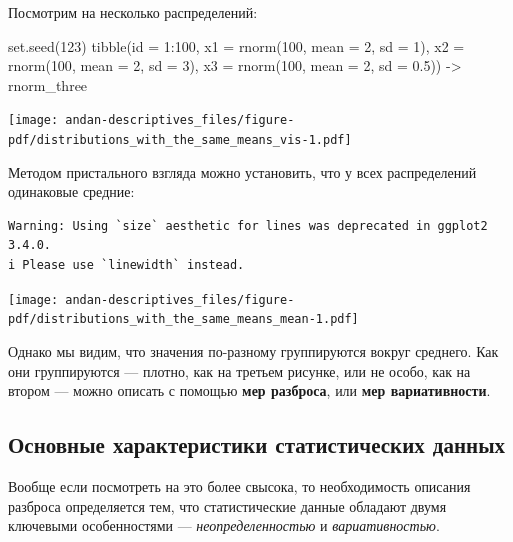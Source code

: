 \documentclass[
  letterpaper,
]{scrbook}
\newenvironment{Shaded}{}{}
\newcommand{\AttributeTok}[1]{\textcolor[rgb]{0.84,0.23,0.29}{#1}}
\newcommand{\DecValTok}[1]{\textcolor[rgb]{0.00,0.36,0.77}{#1}}
\newcommand{\FloatTok}[1]{\textcolor[rgb]{0.00,0.36,0.77}{#1}}
\newcommand{\FunctionTok}[1]{\textcolor[rgb]{0.44,0.26,0.76}{#1}}
\newcommand{\NormalTok}[1]{\textcolor[rgb]{0.14,0.16,0.18}{#1}}
\newcommand{\OtherTok}[1]{\textcolor[rgb]{0.44,0.26,0.76}{#1}}
\newcommand{\SpecialCharTok}[1]{\textcolor[rgb]{0.00,0.36,0.77}{#1}}
\theoremstyle{definition}
\theoremstyle{remark}
\begin{document}
Посмотрим на несколько распределений:

\begin{Shaded}
\begin{Highlighting}[]
\FunctionTok{set.seed}\NormalTok{(}\DecValTok{123}\NormalTok{)}
\FunctionTok{tibble}\NormalTok{(}\AttributeTok{id =} \DecValTok{1}\SpecialCharTok{:}\DecValTok{100}\NormalTok{,}
       \AttributeTok{x1 =} \FunctionTok{rnorm}\NormalTok{(}\DecValTok{100}\NormalTok{, }\AttributeTok{mean =} \DecValTok{2}\NormalTok{, }\AttributeTok{sd =} \DecValTok{1}\NormalTok{),}
       \AttributeTok{x2 =} \FunctionTok{rnorm}\NormalTok{(}\DecValTok{100}\NormalTok{, }\AttributeTok{mean =} \DecValTok{2}\NormalTok{, }\AttributeTok{sd =} \DecValTok{3}\NormalTok{),}
       \AttributeTok{x3 =} \FunctionTok{rnorm}\NormalTok{(}\DecValTok{100}\NormalTok{, }\AttributeTok{mean =} \DecValTok{2}\NormalTok{, }\AttributeTok{sd =} \FloatTok{0.5}\NormalTok{)) }\OtherTok{{-}\textgreater{}}\NormalTok{ rnorm\_three}
\end{Highlighting}
\end{Shaded}

\texttt{[image: andan-descriptives\_files/figure-pdf/distributions\_with\_the\_same\_means\_vis-1.pdf]}

Методом пристального взгляда можно установить, что у всех распределений
одинаковые средние:

\begin{verbatim}
Warning: Using `size` aesthetic for lines was deprecated in ggplot2 3.4.0.
i Please use `linewidth` instead.
\end{verbatim}

\texttt{[image: andan-descriptives\_files/figure-pdf/distributions\_with\_the\_same\_means\_mean-1.pdf]}

Однако мы видим, что значения по-разному группируются вокруг среднего.
Как они группируются --- плотно, как на третьем рисунке, или не особо,
как на втором --- можно описать с помощью \textbf{мер разброса}, или
\textbf{мер вариативности}.

\subsection{Основные характеристики статистических
данных}\label{key_features_of_data}

Вообще если посмотреть на это более свысока, то необходимость описания
разброса определяется тем, что статистические данные обладают двумя
ключевыми особенностями --- \emph{неопределенностью} и
\emph{вариативностью}.
\end{document}
